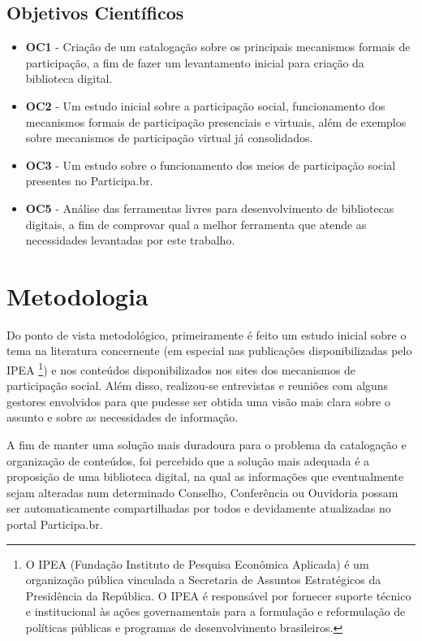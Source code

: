 \subsection*{Objetivos Científicos}

\begin{itemize}
\item \textbf{OC1} - Criação de um catalogação sobre os principais mecanismos formais de participação, a fim de fazer um levantamento inicial para criação da biblioteca digital.
\item \textbf{OC2} - Um estudo inicial sobre a participação social, funcionamento dos mecanismos formais de participação presenciais e virtuais, além de exemplos sobre mecanismos de participação virtual já consolidados.
\item \textbf{OC3} - Um estudo sobre o funcionamento dos meios de participação social presentes no Participa.br.
\item \textbf{OC5} - Análise das ferramentas livres para desenvolvimento de bibliotecas digitais, a fim de comprovar qual a melhor ferramenta que atende as necessidades levantadas por este trabalho.
\end{itemize}
	 	

\section{Metodologia}

Do ponto de vista metodológico, primeiramente é feito um estudo inicial sobre o tema na literatura concernente (em especial nas publicações disponibilizadas pelo IPEA \footnote{O IPEA (Fundação Instituto de Pesquisa Econômica Aplicada) é um organização pública vinculada a Secretaria de Assuntos Estratégicos da Presidência da República. O IPEA é responsável por fornecer suporte técnico e institucional às ações governamentais para a formulação e reformulação de políticas públicas e programas de desenvolvimento brasileiros.}) e nos conteúdos disponibilizados nos sites dos mecanismos de participação social. Além disso, realizou-se entrevistas e reuniões com alguns gestores envolvidos para que pudesse ser obtida uma visão mais clara sobre o assunto e sobre as necessidades de informação.

A fim de manter uma solução mais duradoura para o problema da catalogação e organização de conteúdos, foi percebido que a solução mais adequada é a proposição de uma biblioteca digital, na qual as informações que eventualmente sejam alteradas num determinado Conselho, Conferência ou Ouvidoria possam ser automaticamente compartilhadas por todos e devidamente atualizadas no portal Participa.br.

